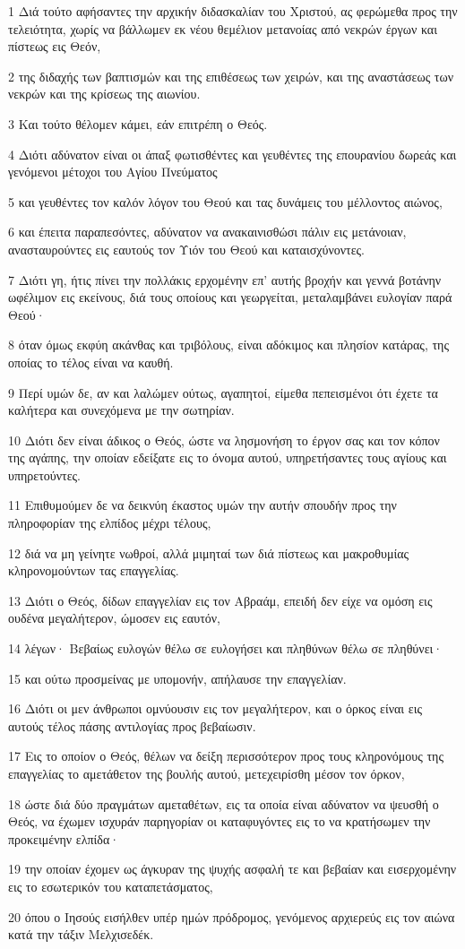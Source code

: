 \par 1 Διά τούτο αφήσαντες την αρχικήν διδασκαλίαν του Χριστού, ας φερώμεθα προς την τελειότητα, χωρίς να βάλλωμεν εκ νέου θεμέλιον μετανοίας από νεκρών έργων και πίστεως εις Θεόν,
\par 2 της διδαχής των βαπτισμών και της επιθέσεως των χειρών, και της αναστάσεως των νεκρών και της κρίσεως της αιωνίου.
\par 3 Και τούτο θέλομεν κάμει, εάν επιτρέπη ο Θεός.
\par 4 Διότι αδύνατον είναι οι άπαξ φωτισθέντες και γευθέντες της επουρανίου δωρεάς και γενόμενοι μέτοχοι του Αγίου Πνεύματος
\par 5 και γευθέντες τον καλόν λόγον του Θεού και τας δυνάμεις του μέλλοντος αιώνος,
\par 6 και έπειτα παραπεσόντες, αδύνατον να ανακαινισθώσι πάλιν εις μετάνοιαν, ανασταυρούντες εις εαυτούς τον Υιόν του Θεού και καταισχύνοντες.
\par 7 Διότι γη, ήτις πίνει την πολλάκις ερχομένην επ' αυτής βροχήν και γεννά βοτάνην ωφέλιμον εις εκείνους, διά τους οποίους και γεωργείται, μεταλαμβάνει ευλογίαν παρά Θεού·
\par 8 όταν όμως εκφύη ακάνθας και τριβόλους, είναι αδόκιμος και πλησίον κατάρας, της οποίας το τέλος είναι να καυθή.
\par 9 Περί υμών δε, αν και λαλώμεν ούτως, αγαπητοί, είμεθα πεπεισμένοι ότι έχετε τα καλήτερα και συνεχόμενα με την σωτηρίαν.
\par 10 Διότι δεν είναι άδικος ο Θεός, ώστε να λησμονήση το έργον σας και τον κόπον της αγάπης, την οποίαν εδείξατε εις το όνομα αυτού, υπηρετήσαντες τους αγίους και υπηρετούντες.
\par 11 Επιθυμούμεν δε να δεικνύη έκαστος υμών την αυτήν σπουδήν προς την πληροφορίαν της ελπίδος μέχρι τέλους,
\par 12 διά να μη γείνητε νωθροί, αλλά μιμηταί των διά πίστεως και μακροθυμίας κληρονομούντων τας επαγγελίας.
\par 13 Διότι ο Θεός, δίδων επαγγελίαν εις τον Αβραάμ, επειδή δεν είχε να ομόση εις ουδένα μεγαλήτερον, ώμοσεν εις εαυτόν,
\par 14 λέγων· Βεβαίως ευλογών θέλω σε ευλογήσει και πληθύνων θέλω σε πληθύνει·
\par 15 και ούτω προσμείνας με υπομονήν, απήλαυσε την επαγγελίαν.
\par 16 Διότι οι μεν άνθρωποι ομνύουσιν εις τον μεγαλήτερον, και ο όρκος είναι εις αυτούς τέλος πάσης αντιλογίας προς βεβαίωσιν.
\par 17 Εις το οποίον ο Θεός, θέλων να δείξη περισσότερον προς τους κληρονόμους της επαγγελίας το αμετάθετον της βουλής αυτού, μετεχειρίσθη μέσον τον όρκον,
\par 18 ώστε διά δύο πραγμάτων αμεταθέτων, εις τα οποία είναι αδύνατον να ψευσθή ο Θεός, να έχωμεν ισχυράν παρηγορίαν οι καταφυγόντες εις το να κρατήσωμεν την προκειμένην ελπίδα·
\par 19 την οποίαν έχομεν ως άγκυραν της ψυχής ασφαλή τε και βεβαίαν και εισερχομένην εις το εσωτερικόν του καταπετάσματος,
\par 20 όπου ο Ιησούς εισήλθεν υπέρ ημών πρόδρομος, γενόμενος αρχιερεύς εις τον αιώνα κατά την τάξιν Μελχισεδέκ.

